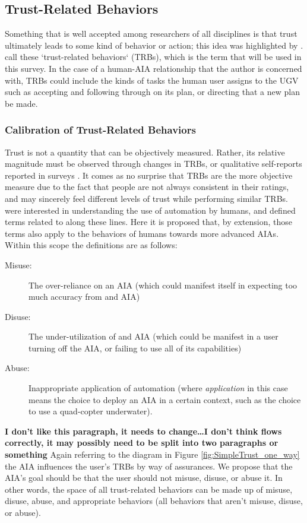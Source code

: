 \subsection{Trust-Related Behaviors} \label{sec:trbs}
Something that is well accepted among researchers of all disciplines is that trust ultimately leads to some kind of behavior or action; this idea was highlighted by \citet{Lewis1985-pr}.  \citet{McKnight2001-fa} call these `trust-related behaviors` (TRBs), which is the term that will be used in this survey. In the case of a human-AIA relationship that the author is concerned with, TRBs could include the kinds of tasks the human user assigns to the UGV such as accepting and following through on its plan, or directing that a new plan be made.

\subsubsection{Calibration of Trust-Related Behaviors}
    Trust is not a quantity that can be objectively measured. Rather, its relative magnitude must be observed through changes in TRBs, or qualitative self-reports reported in surveys \cite{Muir1996-gt}. It comes as no surprise that TRBs are the more objective measure due to the fact that people are not always consistent in their ratings, and may sincerely feel different levels of trust while performing similar TRBs. \citet{Parasuraman1997-co} were interested in understanding the use of automation by humans, and defined terms related to along these lines. Here it is proposed that, by extension, those terms also apply to the behaviors of humans towards more advanced AIAs. Within this scope the definitions are as follows:
    
    \begin{description}
        \item [Misuse:] The over-reliance on an AIA (which could manifest itself in expecting too much accuracy from and AIA)
        \item [Disuse:] The under-utilization of and AIA (which could be manifest in a user turning off the AIA, or failing to use all of its capabilities)
        \item [Abuse:] Inappropriate application of automation (where \emph{application} in this case means the choice to deploy an AIA in a certain context, such as the choice to use a quad-copter underwater).
    \end{description}

    \textbf{I don't like this paragraph, it needs to change\ldots I don't think flows correctly, it may possibly need to be split into two paragraphs or something}
    Again referring to the diagram in Figure \ref{fig:SimpleTrust_one_way} the AIA influences the user's TRBs by way of assurances. We propose that the AIA's goal should be that the user should not misuse, disuse, or abuse it. In other words, the space of all trust-related behaviors can be made up of misuse, disuse, abuse, and appropriate behaviors (all behaviors that aren't misuse, disuse, or abuse).
    
